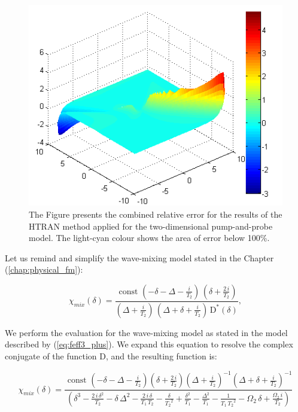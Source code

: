 \documentclass[12pt,twoside,a4paper]{article}
\numberwithin{equation}{subsection}
\numberwithin{figure}{subsection}
\begin{document}
\begin{figure}
  \begin{center}
    \includegraphics{img/htran_pnp_3derr.png}
    \caption{The Figure presents the combined relative error for the results of the HTRAN method applied for the two-dimensional
    pump-and-probe model. The light-cyan colour shows the area of error below 100\%. 
    \label{fig:htran_pnp_3derr}}
  \end{center}
\end{figure} %

Let us remind and simplify the wave-mixing model stated in the Chapter (\ref{chap:physical_fm}):

\begin{equation} \label{eq:htran_fm}
	\chi_{mix} (\delta) =
      \frac { \text{ const } ( - \delta - \Delta - \frac{i}{ { T_{2} } } ) \, ( \delta  + \frac{2 \, i} { { T_{2} } } ) }
            { ( \Delta + \frac {i}{ { T_{2} } } ) \, ( \Delta  + \delta  + \frac {i}{ { T_{2} } } ) \, { \mathrm{D} } ^ {*} (\delta) },
\end{equation}

We perform the evaluation for the wave-mixing model as stated in the model described by (\ref{eq:feff3_plus}). We expand this
equation to resolve the complex conjugate of the function D, and the resulting function is:

\begin{equation} \label{eq:htran_feffexp}
  \chi_{mix}( \delta ) = 
    \frac{ \text{ const } 
           ( - \delta - \Delta - \frac {i}{ T_{2} } ) 
           ( \delta + \frac{2 \, i}{ T_{2} } ) 
	       ( \Delta + \frac {i}{ T_{2} } ) ^ {-1} 
	       ( \Delta + \delta + \frac {i}{ T_{2} } ) ^ {-1} } 
	     { ( \delta^{3} 
	       - \frac{2 \, i \, \delta^{2} } { T_{2} } 
	       - \delta \,\Delta^{2} 
	       - \frac {2\,i\,\delta } { T_{1}  \, T_{2} } 
	       - \frac{ \delta }{ {T_{2} } ^ {2} } 
	       + \frac { \delta^{2} } { T_{1} } 
	       - \frac { \Delta^{2} } { T_{1} } 
	       - \frac {1}{ { T_{1} } \, {T_{2}}^{2}} 
	       - {\Omega_{2}}\,\delta  
	       + \frac { \Omega_{2} \, i} { T_{2} } ) }
\end{equation}	     
\end{document}
